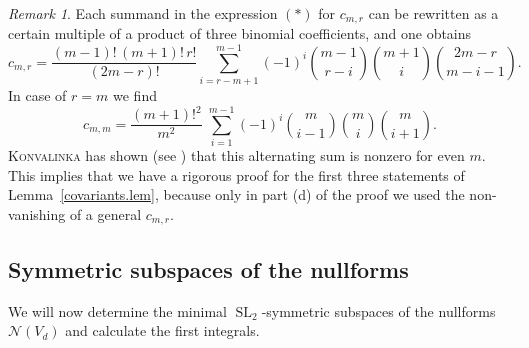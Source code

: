 \documentclass{amsart}
\theoremstyle{definition}
\theoremstyle{remark}
\newtheorem{rem}[thm]{Remark}
\begin{document}
\begin{rem}\label{Konvalinka.rem}
Each summand in the expression $(*)$ for $c_{m,r}$ can be rewritten as a certain multiple of a product of three binomial coefficients, and one obtains
\[
c_{m,r}= \frac{(m-1)!\,(m+1)!\,r!}{(2m-r)!}\sum_{i=r-m+1}^{m-1}(-1)^{i} \binom{m-1}{r-i}\binom{m + 1}{ i}\binom{2 m - r}{ m - i - 1}.
\]
In case of $r=m$ we find
\[\tag{$*\!*\!*$}
c_{m,m}= \frac{(m+1)!^{2}}{m^{2}}\;\sum_{i=1}^{m-1}(-1)^{i} \binom{m}{i-1}\binom{m}{ i}\binom{m}{i+1}.
\]
{\textsc{{Konvalinka}\/}} has shown (see \cite[formula~1.1]{Ko2008An-inverse-matrix-}) that this alternating sum is nonzero  for even $m$. This implies that we have a rigorous proof for the first three statements of Lemma~\ref{covariants.lem}, because only in part (d) of the proof we used the non-vanishing of a general $c_{m,r}$.
\end{rem}
{\par\smallskip}
\subsection{Symmetric subspaces of the nullforms}
We will now determine the minimal ${\operatorname{SL}_{2}}$-symmetric subspaces of the nullforms ${\mathcal N}(V_{d})$ and calculate the first integrals.
\end{document}
